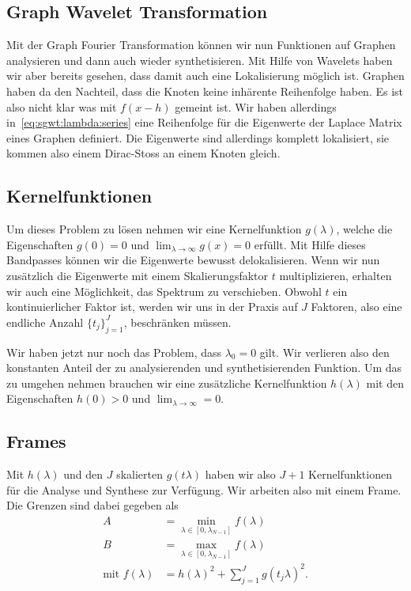 \subsection{Graph Wavelet Transformation\label{subsec:sgwt:gwt}}

Mit der Graph Fourier Transformation k\"onnen wir nun Funktionen auf Graphen 
analysieren und dann auch wieder synthetisieren. Mit Hilfe von Wavelets haben 
wir aber bereits gesehen, dass damit auch eine Lokalisierung m\"oglich ist. 
Graphen haben da den Nachteil, dass die Knoten keine inh\"arente Reihenfolge 
haben. Es ist also nicht klar was mit $f(x - h)$ gemeint ist. Wir haben 
allerdings in~\cref{eq:sgwt:lambda:series} eine Reihenfolge f\"ur die 
Eigenwerte der Laplace Matrix eines Graphen definiert. Die Eigenwerte sind 
allerdings komplett lokalisiert, sie kommen also einem Dirac-Stoss an 
einem Knoten gleich.

\subsection{Kernelfunktionen}

Um dieses Problem zu l\"osen nehmen wir eine Kernelfunktion $g(\lambda)$, 
welche die Eigenschaften $g(0) = 0$ und $\lim_{\lambda\to\infty} g(x) = 0$ 
erf\"ullt. Mit Hilfe dieses Bandpasses k\"onnen wir die Eigenwerte bewusst 
delokalisieren. Wenn wir nun zus\"atzlich die Eigenwerte mit einem 
Skalierungsfaktor $t$ multiplizieren, erhalten wir auch eine 
M\"oglichkeit, das Spektrum zu verschieben. Obwohl $t$ ein kontinuierlicher 
Faktor ist, werden wir uns in der Praxis auf $J$ Faktoren, also eine endliche 
Anzahl $\{t_j\}^J_{j=1}$, beschr\"anken m\"ussen.

Wir haben jetzt nur noch das Problem, dass $\lambda_0 = 0$ gilt. Wir verlieren 
also den konstanten Anteil der zu analysierenden und synthetisierenden 
Funktion. Um das zu umgehen nehmen brauchen wir eine zus\"atzliche 
Kernelfunktion $h(\lambda)$ mit den Eigenschaften $h(0) > 0$ und 
$\lim_{\lambda\to\infty} = 0$.

\subsection{Frames}

Mit $h(\lambda)$ und den $J$ skalierten $g(t\lambda)$ haben wir also $J + 1$ 
Kernelfunktionen f\"ur die Analyse und Synthese zur Verf\"ugung. Wir arbeiten 
also mit einem Frame. Die Grenzen sind dabei gegeben als
\begin{align*}
A &= \min_{\lambda \in \left[0, \lambda_{N-1}\right]} f(\lambda) \\
B &= \max_{\lambda \in \left[0, \lambda_{N-1}\right]} f(\lambda) \\
\text{mit } f(\lambda) &= h(\lambda)^2 + \sum_{j = 1}^{J} g(t_j\lambda)^2.
\end{align*}

